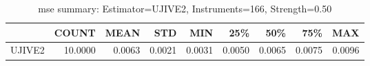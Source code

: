 \begin{table}[ht]
\centering
\caption{mse summary: Estimator=UJIVE2, Instruments=166, Strength=0.50}
\begin{tabular}{lrrrrrrrr}
\toprule
 & COUNT & MEAN & STD & MIN & 25\% & 50\% & 75\% & MAX \\
\midrule
UJIVE2 & 10.0000 & 0.0063 & 0.0021 & 0.0031 & 0.0050 & 0.0065 & 0.0075 & 0.0096 \\
\bottomrule
\end{tabular}
\end{table}
